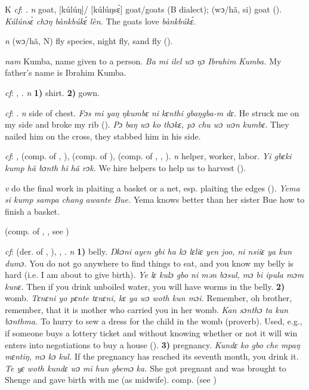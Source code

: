 \begin{letter}{K}
 \textit{cf}: . \textit{n} goat, [kúlúŋ]/ [kúlúŋsɛ̀] goat/goats (B dialect); (wɔ/hã, si) goat (\citealt{Pichl1967}). \textit{Kúlúnsɛ̀ chɔŋ bànkbúkɛ́ lèn.} The goats love \textit{bànkbúkɛ́}. 

 \textit{n} (wɔ/hã, N) fly species, night fly, sand fly (\citealt{Pichl1967}). 

 \textit{nam} Kumba, name given to a person. \textit{Ba mi ilel wɔ ŋɔ Ibrahim Kumba.} My father's name is Ibrahim Kumba.

 \textit{cf}: , . \textit{n} \textbf{1)} shirt. \textbf{2)} gown.

 \textit{cf}: . \textit{n} side of chest. \textit{Fɔs mi yaŋ ŋkumbɛ ni kɛnthi gbaŋgba-m dɛ.} He struck me on my side and broke my rib (\citealt{Pichl1967}). \textit{Pɔ baŋ wɔ ko thɔkɛ, pɔ chu wɔ wɔn kumbɛ.} They nailed him on the cross, they stabbed him in his side.

 \textit{cf}: ,  (comp. of , ),  (comp. of ),  (comp. of , , ). \textit{n} helper, worker, labor. \textit{Yi gbɛki kump hã bɔnth hi hã rɔk.} We hire helpers to help us to harvest (\citealt{Pichl1967}). 

 \textit{v} do the final work in plaiting a basket or a net, esp. plaiting the edges (\citealt{Pichl1967}). \textit{Yema si kump sampa chang awante Bue.} Yema knows better than her sister Bue how to finish a basket.

 (comp. of , , see ) 

 \textit{cf}:  (der. of , ), , . \textit{n} \textbf{1)} belly. \textit{Ŋkɔni ayen gbi ha kɔ lɛliɛ yen joo, ni nsiiɛ ya kun dumɔ.} You do not go anywhere to find things to eat, and you know my belly is hard (i.e. I am about to give birth). \textit{Ye lɛ kulɔ gbo ni mən bɔsul, mɔ bi ipula mɔm kunɛ.} Then if you drink unboiled water, you will have worms in the belly. \textbf{2)} womb. \textit{Tɛnɛni yo pɛnte tɛnɛni, kɛ ya wɔ woth kun mɔi.} Remember, oh brother, remember, that it is mother who carried you in her womb. \textit{Kan sɔnthɔ ta kun bɔnthma.} To hurry to sew a dress for the child in the womb (proverb). Used, e.g., if someone buys a lottery ticket and without knowing whether or not it will win enters into negotiations to buy a house (\citealt{Pichl1967}). \textbf{3)} pregnancy. \textit{Kundɛ ko gbo che mpaŋ mɛntiŋ, mɔ kɔ kul.} If the pregnancy has reached its seventh month, you drink it. \textit{Te yɛ woth kundɛ wɔ mi hun gbemɔ ka.} She got pregnant and was brought to Shenge and gave birth with me (as midwife). comp.  (see ) 


\end{letter}
